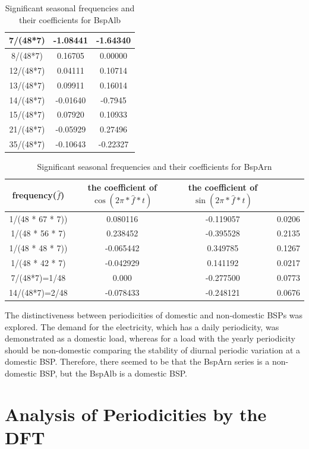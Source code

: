 \documentclass[12pt,msc]{uom_eee_dissertation_casson}
\begin{document}
\begin{table}
\begin{tabular}{| c | c | c | }
7/(48*7)         & -1.08441&-1.64340\\ \hline
8/(48*7)         &  0.16705& 0.00000\\ \hline
12/(48*7)        &  0.04111& 0.10714\\ \hline
13/(48*7)        &  0.09911& 0.16014\\ \hline
14/(48*7)        & -0.01640&-0.7945 \\ \hline
15/(48*7)        &  0.07920& 0.10933\\ \hline
21/(48*7)        & -0.05929& 0.27496\\ \hline
35/(48*7)        & -0.10643&-0.22327 \\ \hline
	\end{tabular}
\caption{Significant seasonal frequencies and their coefficients for BspAlb
     }
	\label{table:6}
\end{table}

\begin{table}
\centering
\begin{tabular}{| c | c | c | c |}
		\hline
		 frequency($\hat{f}$)& the coefficient of $\cos(2\pi *\hat{f}*t)$  & the coefficient of $\sin(2\pi *\hat{f}*t)$  \\ \hline
1/(48 * 67 * 7))   &  0.080116 & -0.119057 & 0.0206\\ \hline
1/(48 * 56 * 7)    &  0.238452 & -0.395528 & 0.2135\\ \hline
1/(48 * 48 * 7))   & -0.065442 &  0.349785 & 0.1267\\ \hline
1/(48 * 42 * 7)    & -0.042929 &  0.141192 & 0.0217\\ \hline
7/(48*7)=1/48      &  0.000    & -0.277500 & 0.0773\\ \hline
14/(48*7)=2/48     & -0.078433 & -0.248121 & 0.0676\\ \hline
	\end{tabular}
\caption{Significant seasonal frequencies and their coefficients for BspArn}
	\label{table:7}
\end{table}
The distinctiveness between periodicities of domestic and non-domestic BSPs was explored. The demand for the electricity, which has a daily periodicity, was demonstrated as a domestic load, whereas for a load with the yearly periodicity should be non-domestic comparing the stability of diurnal periodic variation at a domestic BSP. Therefore, there seemed to be that the BspArn series is a non-domestic BSP, but the BspAlb is a domestic BSP.

\chapter{Analysis of Periodicities by the DFT}
\label{chap:dft-analysis}
\end{document}
